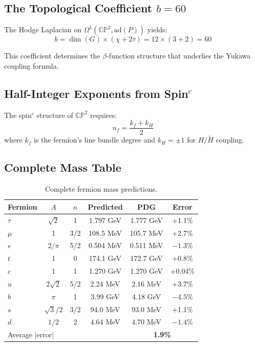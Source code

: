 \documentclass[11pt,a4paper]{article}
\newcommand{\CP}{\mathbb{CP}}
\begin{document}
\subsection{The Topological Coefficient $b = 60$}

The Hodge Laplacian on $\Omega^1(\CP^2, \text{ad}(P))$ yields:
\begin{equation}
b = \dim(G) \times (\chi + 2\tau) = 12 \times (3 + 2) = 60
\end{equation}

This coefficient determines the $\beta$-function structure that underlies the Yukawa coupling formula.

\subsection{Half-Integer Exponents from Spin$^c$}

The spin$^c$ structure of $\CP^2$ requires:
\begin{equation}
n_f = \frac{k_f + k_H}{2}
\end{equation}
where $k_f$ is the fermion's line bundle degree and $k_H = \pm 1$ for $H/\tilde{H}$ coupling.

\subsection{Complete Mass Table}

\begin{table}[h]
\centering
\begin{tabular}{lccccc}
\toprule
Fermion & $A$ & $n$ & Predicted & PDG & Error \\
\midrule
$\tau$ & $\sqrt{2}$ & 1 & 1.797 GeV & 1.777 GeV & +1.1\% \\
$\mu$ & 1 & 3/2 & 108.5 MeV & 105.7 MeV & +2.7\% \\
$e$ & $2/\pi$ & 5/2 & 0.504 MeV & 0.511 MeV & $-1.3$\% \\
$t$ & 1 & 0 & 174.1 GeV & 172.7 GeV & +0.8\% \\
$c$ & 1 & 1 & 1.270 GeV & 1.270 GeV & +0.04\% \\
$u$ & $2\sqrt{2}$ & 5/2 & 2.24 MeV & 2.16 MeV & +3.7\% \\
$b$ & $\pi$ & 1 & 3.99 GeV & 4.18 GeV & $-4.5$\% \\
$s$ & $\sqrt{3}/2$ & 3/2 & 94.0 MeV & 93.0 MeV & +1.1\% \\
$d$ & $1/2$ & 2 & 4.64 MeV & 4.70 MeV & $-1.4$\% \\
\midrule
\multicolumn{4}{l}{Average $|$error$|$} & \multicolumn{2}{c}{\textbf{1.9\%}} \\
\bottomrule
\end{tabular}
\caption{Complete fermion mass predictions.}
\end{table}
\end{document}
